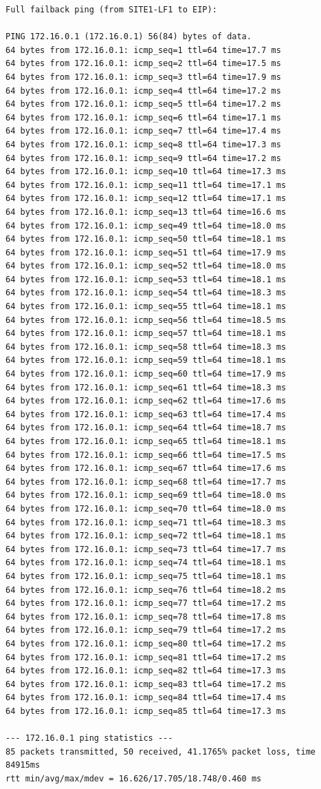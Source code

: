 \documentclass[11pt]{article}
\begin{document}
\begin{verbatim}
Full failback ping (from SITE1-LF1 to EIP):

PING 172.16.0.1 (172.16.0.1) 56(84) bytes of data.
64 bytes from 172.16.0.1: icmp_seq=1 ttl=64 time=17.7 ms
64 bytes from 172.16.0.1: icmp_seq=2 ttl=64 time=17.5 ms
64 bytes from 172.16.0.1: icmp_seq=3 ttl=64 time=17.9 ms
64 bytes from 172.16.0.1: icmp_seq=4 ttl=64 time=17.2 ms
64 bytes from 172.16.0.1: icmp_seq=5 ttl=64 time=17.2 ms
64 bytes from 172.16.0.1: icmp_seq=6 ttl=64 time=17.1 ms
64 bytes from 172.16.0.1: icmp_seq=7 ttl=64 time=17.4 ms
64 bytes from 172.16.0.1: icmp_seq=8 ttl=64 time=17.3 ms
64 bytes from 172.16.0.1: icmp_seq=9 ttl=64 time=17.2 ms
64 bytes from 172.16.0.1: icmp_seq=10 ttl=64 time=17.3 ms
64 bytes from 172.16.0.1: icmp_seq=11 ttl=64 time=17.1 ms
64 bytes from 172.16.0.1: icmp_seq=12 ttl=64 time=17.1 ms
64 bytes from 172.16.0.1: icmp_seq=13 ttl=64 time=16.6 ms
64 bytes from 172.16.0.1: icmp_seq=49 ttl=64 time=18.0 ms
64 bytes from 172.16.0.1: icmp_seq=50 ttl=64 time=18.1 ms
64 bytes from 172.16.0.1: icmp_seq=51 ttl=64 time=17.9 ms
64 bytes from 172.16.0.1: icmp_seq=52 ttl=64 time=18.0 ms
64 bytes from 172.16.0.1: icmp_seq=53 ttl=64 time=18.1 ms
64 bytes from 172.16.0.1: icmp_seq=54 ttl=64 time=18.3 ms
64 bytes from 172.16.0.1: icmp_seq=55 ttl=64 time=18.1 ms
64 bytes from 172.16.0.1: icmp_seq=56 ttl=64 time=18.5 ms
64 bytes from 172.16.0.1: icmp_seq=57 ttl=64 time=18.1 ms
64 bytes from 172.16.0.1: icmp_seq=58 ttl=64 time=18.3 ms
64 bytes from 172.16.0.1: icmp_seq=59 ttl=64 time=18.1 ms
64 bytes from 172.16.0.1: icmp_seq=60 ttl=64 time=17.9 ms
64 bytes from 172.16.0.1: icmp_seq=61 ttl=64 time=18.3 ms
64 bytes from 172.16.0.1: icmp_seq=62 ttl=64 time=17.6 ms
64 bytes from 172.16.0.1: icmp_seq=63 ttl=64 time=17.4 ms
64 bytes from 172.16.0.1: icmp_seq=64 ttl=64 time=18.7 ms
64 bytes from 172.16.0.1: icmp_seq=65 ttl=64 time=18.1 ms
64 bytes from 172.16.0.1: icmp_seq=66 ttl=64 time=17.5 ms
64 bytes from 172.16.0.1: icmp_seq=67 ttl=64 time=17.6 ms
64 bytes from 172.16.0.1: icmp_seq=68 ttl=64 time=17.7 ms
64 bytes from 172.16.0.1: icmp_seq=69 ttl=64 time=18.0 ms
64 bytes from 172.16.0.1: icmp_seq=70 ttl=64 time=18.0 ms
64 bytes from 172.16.0.1: icmp_seq=71 ttl=64 time=18.3 ms
64 bytes from 172.16.0.1: icmp_seq=72 ttl=64 time=18.1 ms
64 bytes from 172.16.0.1: icmp_seq=73 ttl=64 time=17.7 ms
64 bytes from 172.16.0.1: icmp_seq=74 ttl=64 time=18.1 ms
64 bytes from 172.16.0.1: icmp_seq=75 ttl=64 time=18.1 ms
64 bytes from 172.16.0.1: icmp_seq=76 ttl=64 time=18.2 ms
64 bytes from 172.16.0.1: icmp_seq=77 ttl=64 time=17.2 ms
64 bytes from 172.16.0.1: icmp_seq=78 ttl=64 time=17.8 ms
64 bytes from 172.16.0.1: icmp_seq=79 ttl=64 time=17.2 ms
64 bytes from 172.16.0.1: icmp_seq=80 ttl=64 time=17.2 ms
64 bytes from 172.16.0.1: icmp_seq=81 ttl=64 time=17.2 ms
64 bytes from 172.16.0.1: icmp_seq=82 ttl=64 time=17.3 ms
64 bytes from 172.16.0.1: icmp_seq=83 ttl=64 time=17.2 ms
64 bytes from 172.16.0.1: icmp_seq=84 ttl=64 time=17.4 ms
64 bytes from 172.16.0.1: icmp_seq=85 ttl=64 time=17.3 ms

--- 172.16.0.1 ping statistics ---
85 packets transmitted, 50 received, 41.1765% packet loss, time 84915ms
rtt min/avg/max/mdev = 16.626/17.705/18.748/0.460 ms
\end{verbatim}
\end{document}
